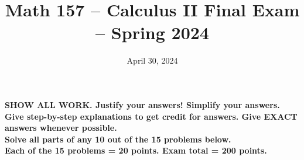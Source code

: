 \documentclass[10pt]{article}
\title{Math 157 -- Calculus II Final Exam -- Spring 2024}
\date{April 30, 2024}	%
\begin{document}
\maketitle

\begin{center}
\noindent \textbf{SHOW ALL WORK. Justify your answers! Simplify your answers. Give step-by-step explanations to get credit for answers. Give EXACT answers whenever possible.\\Solve all parts of any 10 out of the 15 problems below.\\Each of the 15 problems = 20 points. Exam total = 200 points.}
\end{center}
\end{document}
